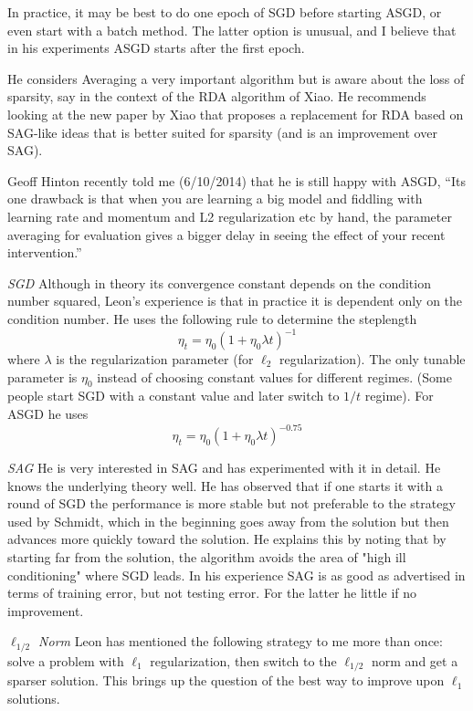 \documentclass[12pt]{article}
\begin{document}
In practice, it may be best to do one epoch of SGD before starting ASGD, or even start with a batch method. The latter option is unusual, and I believe that in his experiments ASGD starts after the first epoch.

 He considers Averaging a very important algorithm but is aware about the loss of sparsity, say in the context of the RDA algorithm of Xiao. He recommends looking at the new paper by Xiao that proposes a replacement for RDA based on SAG-like ideas that is better suited for sparsity (and is an improvement over SAG).
 
 Geoff Hinton recently told me (6/10/2014) that he is still happy with ASGD, ``Its one drawback is that when you are learning a big model and fiddling with learning rate and momentum and L2 regularization etc by hand,  the parameter averaging for evaluation gives a bigger delay in seeing the effect of your recent intervention.''

\medskip\noindent\emph{SGD}
Although in theory its convergence constant depends on the condition number squared, Leon's experience is that in practice it is dependent only on the condition number. He uses the following rule to determine the steplength
\[    \eta_t = \eta_0(1+\eta_0 \lambda t)^{-1}
\]
where $\lambda$ is the regularization parameter (for $\ell_2$ regularization).
The only tunable parameter is $\eta_0$ instead of choosing constant values for different regimes. (Some people start SGD with a constant value and later switch to $1/t$ regime). For ASGD he uses
\[    \eta_t = \eta_0(1+\eta_0 \lambda t)^{-0.75}
\]

\medskip\noindent\emph{SAG} He is very interested in SAG and has experimented with it in detail. He knows the underlying theory well. He has observed that if one starts it with a round of SGD the performance is more stable but not preferable to the strategy used by Schmidt, which in the beginning goes away from the solution but then advances more quickly toward the solution. He explains this by noting that by starting far from the solution, the algorithm avoids the area of "high ill conditioning" where SGD leads. In his experience SAG is as good as advertised in terms of training error, but not testing error. For the latter he little if no improvement.

\medskip\noindent\emph{$\ell_{1/2}$ Norm} Leon has mentioned the following strategy to me more than once: solve a problem with $\ell_1$ regularization, then switch to the $\ell_{1/2}$ norm and get a sparser solution. This brings up the question of the best way to improve upon $\ell_1$ solutions. 
\end{document}
